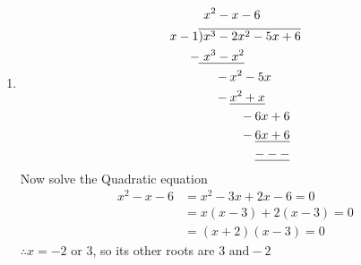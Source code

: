 \begin{multicols}{2}
\begin{enumerate}[label={\textbf{\arabic*.}}]
\item \begin{align*}
         & \hspace{ 4 pt} x ^2 - x -6 \\
        x -1 & \overline{)x^3 - 2x^2 - 5x + 6} \\
        -\hspace{-1pt} & \underline{ \hspace{4pt} x^ 3 - x^2} \\
        -\hspace{-23pt} & \hspace{25pt} x^2 - 5x  \\
       - \hspace{-23pt} &  \hspace{ 25pt} \underline{x^2 + x} \\
       - \hspace{-43pt} & \hspace{ 45pt} 6x + 6 \\
       - \hspace{-43pt} & \hspace{ 45pt} \underline{6x + 6}  \\
        & \hspace{ 45pt} \underline{---} 
    \end{align*}
   Now solve the Quadratic equation 
   \begin{align*} 
    x^2 - x - 6 &= x^2 - 3x + 2x - 6 = 0 \\
    &  = x(x - 3) + 2(x - 3) = 0 \\
    & =  (x + 2)(x - 3) = 0
   \end{align*}
   $\therefore x = -2 \text{ or } 3$, so its other roots are $3 \text{ and} -2$
    

\end{enumerate}
\end{multicols}

